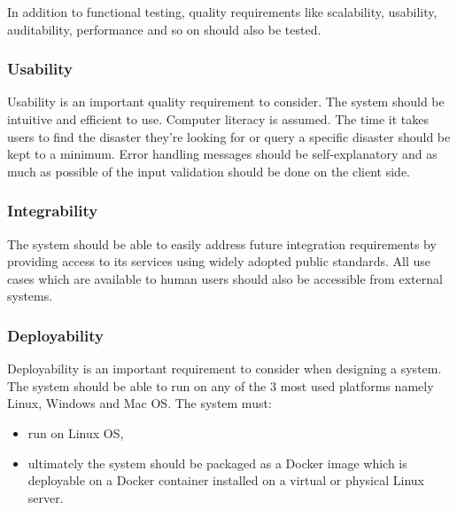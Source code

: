 In addition to functional testing, quality requirements like scalability, usability, auditability, performance and so on should also be tested.

\subsubsection{Usability}
Usability is an important quality requirement to consider. The system should be intuitive and efficient to use. Computer literacy is assumed. The time it takes users to find the disaster they're looking for or query a specific disaster should be kept to a minimum. Error handling messages should be self-explanatory and as much as possible of the input validation should be done on the client side.

\subsubsection{Integrability}
The system should be able to easily address future integration requirements by providing access to its services using widely adopted public standards. All use cases which are available to human users should also be accessible from external systems.

\subsubsection{Deployability}
Deployability is an important requirement to consider when designing a system. The system should be able to run on any of the 3 most used platforms namely Linux, Windows and Mac OS. The system must:
\begin{itemize}
	\item run on Linux OS,
	\item ultimately the system should be packaged as a Docker image which is deployable on a Docker
container installed on a virtual or physical Linux server.
\end{itemize}

